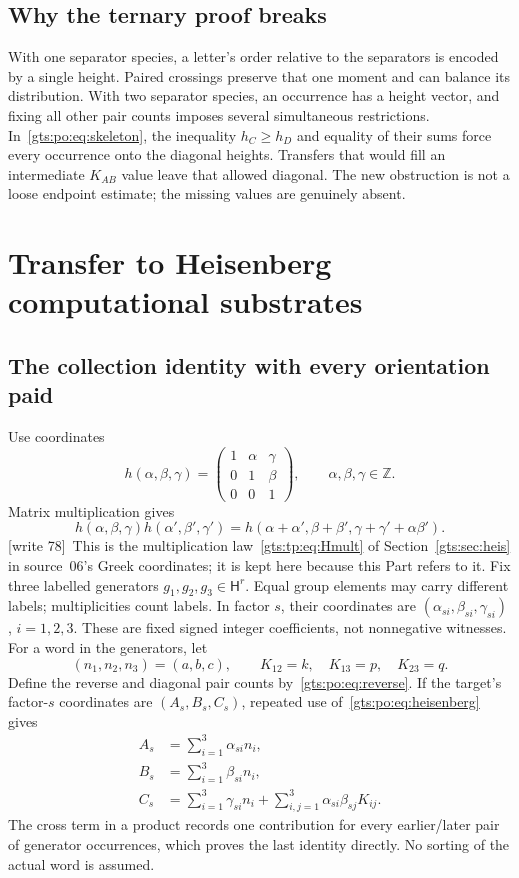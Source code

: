 \documentclass[11pt,letterpaper]{article}
\theoremstyle{definition}
\theoremstyle{remark}
\newcommand{\Z}{\mathbb Z}
\newcommand{\HH}{\mathsf H}
\newcommand{\wtagb}{\textup{[write 78]}}
\begin{document}
\subsection{Why the ternary proof breaks}
With one separator species, a letter's order relative to the separators is encoded by a single height. Paired crossings preserve that one moment and can balance its distribution. With two separator species, an occurrence has a height vector, and fixing all other pair counts imposes several simultaneous restrictions. In~\eqref{gts:po:eq:skeleton}, the inequality $h_C\ge h_D$ and equality of their sums force every occurrence onto the diagonal heights. Transfers that would fill an intermediate $K_{AB}$ value leave that allowed diagonal. The new obstruction is not a loose endpoint estimate; the missing values are genuinely absent.

\section{Transfer to Heisenberg computational substrates}
\subsection{The collection identity with every orientation paid}
Use coordinates
\[
 h(\alpha,\beta,\gamma)=
 \begin{pmatrix}1&\alpha&\gamma\\0&1&\beta\\0&0&1\end{pmatrix},
 \qquad \alpha,\beta,\gamma\in\Z.
\]
Matrix multiplication gives
\begin{equation}\label{gts:po:eq:heisenberg}
 h(\alpha,\beta,\gamma)h(\alpha',\beta',\gamma')
 =h(\alpha+\alpha',\beta+\beta',
       \gamma+\gamma'+\alpha\beta').
\end{equation}
\wtagb\ This is the multiplication law~\eqref{gts:tp:eq:Hmult} of Section~\ref{gts:sec:heis} in source~06's Greek coordinates; it is kept here because this Part refers to it.
Fix three labelled generators $g_1,g_2,g_3\in\HH^r$. Equal group elements may carry different labels; multiplicities count labels. In factor $s$, their coordinates are $(\alpha_{si},\beta_{si},\gamma_{si})$, $i=1,2,3$. These are fixed signed integer coefficients, not nonnegative witnesses. For a word in the generators, let
\[
 (n_1,n_2,n_3)=(a,b,c),\qquad
 K_{12}=k,\quad K_{13}=p,\quad K_{23}=q.
\]
Define the reverse and diagonal pair counts by~\eqref{gts:po:eq:reverse}. If the target's factor-$s$ coordinates are $(A_s,B_s,C_s)$, repeated use of~\eqref{gts:po:eq:heisenberg} gives
\begin{align}
 A_s&=\sum_{i=1}^3\alpha_{si}n_i,\label{gts:po:eq:targetA}\\
 B_s&=\sum_{i=1}^3\beta_{si}n_i,\label{gts:po:eq:targetB}\\
 C_s&=\sum_{i=1}^3\gamma_{si}n_i+
            \sum_{i,j=1}^3\alpha_{si}\beta_{sj}K_{ij}.\label{gts:po:eq:targetC}
\end{align}
The cross term in a product records one contribution for every earlier/later pair of generator occurrences, which proves the last identity directly. No sorting of the actual word is assumed.
\end{document}

